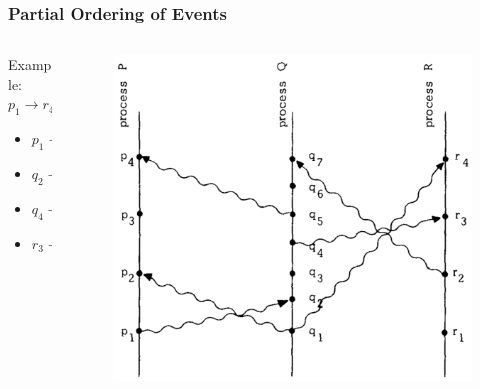 \documentclass{beamer}
\begin{document}
\frame
{
  \frametitle{Partial Ordering of Events}
	\begin{columns}
	\begin{column}{0.6\textwidth}

		Example: $p_1\to r_4$
		\begin{itemize}
			\item<2-> $p_1\to q_2$
			\item<3-> $q_2\to q_4$
			\item<4-> $q_4\to r_3$
			\item<5-> $r_3\to r_4$
		\end{itemize}


	\end{column}
	\begin{column}{0.4\textwidth}

		\begin{figure}[ht!]
		\includegraphics[width=\textwidth]{files/events-messages.png}
		\end{figure}


	\end{column}
	\end{columns}

}
\end{document}
